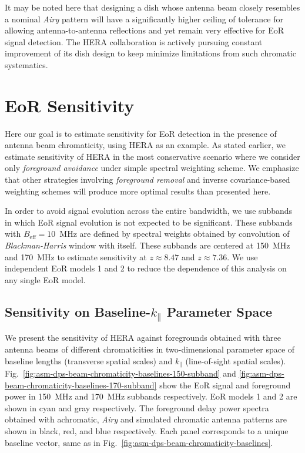 \documentclass[preprint2,iop,numberedappendix,twocolappendix,appendixfloats]{emulateapj}
\begin{document}
It may be noted here that designing a dish whose antenna beam closely resembles a nominal {\it Airy} pattern will have a significantly higher ceiling of tolerance for allowing antenna-to-antenna reflections and yet remain very effective for EoR signal detection. The HERA collaboration is actively pursuing constant improvement of its dish design to keep minimize limitations from such chromatic systematics.

\section{EoR Sensitivity}\label{sec:eor-sensitivity}

Here our goal is to estimate sensitivity for EoR detection in the presence of antenna beam chromaticity, using HERA as an example. As stated earlier, we estimate sensitivity of HERA in the most conservative scenario where we consider only {\it foreground avoidance} under simple spectral weighting scheme. We emphasize that other strategies involving {\it foreground removal} and inverse covariance-based weighting schemes will produce more optimal results than presented here. 

In order to avoid signal evolution across the entire bandwidth, we use subbands in which EoR signal evolution is not expected to be significant. These subbands with $B_\textrm{eff}=10$~MHz are defined by spectral weights obtained by convolution of {\it Blackman-Harris} window with itself. These subbands are centered at 150~MHz and 170~MHz to estimate sensitivity at $z \approx 8.47$ and $z \approx 7.36$. We use independent EoR models 1 and 2 to reduce the dependence of this analysis on any single EoR model.

\subsection{Sensitivity on Baseline-$k_\parallel$ Parameter Space}\label{sec:baseline-kprll}

We present the sensitivity of HERA against foregrounds obtained with three antenna beams of different chromaticities in two-dimensional parameter space of baseline lengths (transverse spatial scales) and $k_\parallel$ (line-of-sight spatial scales). Fig.~\ref{fig:asm-dps-beam-chromaticity-baselines-150-subband} and \ref{fig:asm-dps-beam-chromaticity-baselines-170-subband} show the EoR signal and foreground power in 150~MHz and 170~MHz subbands respectively. EoR models 1 and 2 are shown in cyan and gray respectively. The foreground delay power spectra obtained with achromatic, {\it Airy} and simulated chromatic antenna patterns are shown in black, red, and blue respectively. Each panel corresponds to a unique baseline vector, same as in Fig.~\ref{fig:asm-dps-beam-chromaticity-baselines}. 
\end{document}
